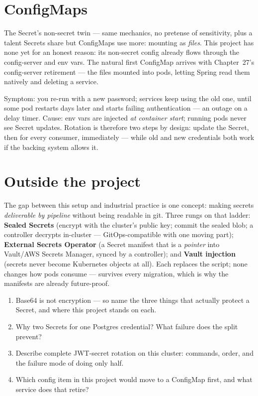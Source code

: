 \section{ConfigMaps}

The Secret's non-secret twin --- same mechanics, no pretense of
sensitivity, plus a talent Secrets share but ConfigMaps use more:
mounting as \emph{files}. This project has none yet for an honest
reason: its non-secret config already flows through the config-server
and env vars. The natural first ConfigMap arrives with Chapter~27's
config-server retirement --- the  files
mounted into pods, letting Spring read them natively and deleting a
service.

\begin{pitfall}
Symptom: you re-run  with a new password;
services keep using the old one, until some pod restarts days later and
starts failing authentication --- an outage on a delay timer.
Cause: env vars are injected \emph{at container start}; running pods
never see Secret updates. Rotation is therefore two steps by design:
update the Secret, then  for every consumer, immediately --- while old and new credentials
both work if the backing system allows it.
\end{pitfall}

\section{Outside the project}

The gap between this setup and industrial practice is one concept:
making secrets \emph{deliverable by pipeline} without being readable in
git. Three rungs on that ladder: \textbf{Sealed Secrets} (encrypt with
the cluster's public key; commit the sealed blob; a controller decrypts
in-cluster --- GitOps-compatible with one moving part);
\textbf{External Secrets Operator} (a Secret manifest that is a
\emph{pointer} into Vault/AWS Secrets Manager, synced by a controller);
and \textbf{Vault injection} (secrets never become Kubernetes objects at
all). Each replaces the script; none changes how pods consume ---
 survives every migration, which is why the manifests are
already future-proof.

\begin{quiz}
\begin{enumerate}
  \item Base64 is not encryption --- so name the three things that
  actually protect a Secret, and where this project stands on each.
  \item Why two Secrets for one Postgres credential? What failure does
  the split prevent?
  \item Describe complete JWT-secret rotation on this cluster: commands,
  order, and the failure mode of doing only half.
  \item Which config item in this project would move to a ConfigMap
  first, and what service does that retire?
\end{enumerate}
\end{quiz}
